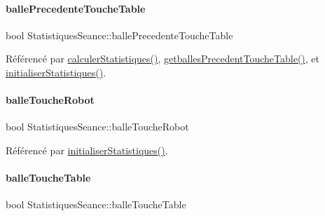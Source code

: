 \paragraph{\texorpdfstring{balle\+Precedente\+Touche\+Table}{ballePrecedenteToucheTable}}
{\footnotesize\ttfamily bool Statistiques\+Seance\+::balle\+Precedente\+Touche\+Table\hspace{0.3cm}{\ttfamily [private]}}



Référencé par \hyperlink{class_statistiques_seance_a8bf60224113e3697adfe0a4f8f22ab7b}{calculer\+Statistiques()}, \hyperlink{class_statistiques_seance_a4f0dc4fd1c97787dab03ae5074fb3414}{getballes\+Precedent\+Touche\+Table()}, et \hyperlink{class_statistiques_seance_a17e1c49e2986a8490ff96e4bd7733291}{initialiser\+Statistiques()}.

\mbox{\label{class_statistiques_seance_af6747af0965a82d7d59a248682bbb575}} 
\paragraph{\texorpdfstring{balle\+Touche\+Robot}{balleToucheRobot}}
{\footnotesize\ttfamily bool Statistiques\+Seance\+::balle\+Touche\+Robot\hspace{0.3cm}{\ttfamily [private]}}



Référencé par \hyperlink{class_statistiques_seance_a17e1c49e2986a8490ff96e4bd7733291}{initialiser\+Statistiques()}.

\mbox{\label{class_statistiques_seance_ad428a6da4f5615a7682c8fa4fb597ce3}} 
\paragraph{\texorpdfstring{balle\+Touche\+Table}{balleToucheTable}}
{\footnotesize\ttfamily bool Statistiques\+Seance\+::balle\+Touche\+Table\hspace{0.3cm}{\ttfamily [private]}}



